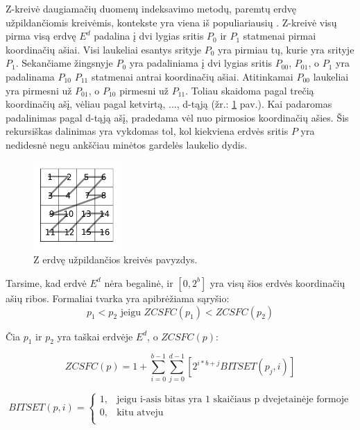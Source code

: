 Z-kreivė daugiamačių duomenų indeksavimo metodų, paremtų erdvę užpildančiomis kreivėmis, kontekste yra viena iš populiariausių \cite{ramsak2000integrating}.
Z-kreivė visų pirma visą erdvę $E^d$ padalina į dvi lygias sritis $P_0$ ir $P_1$ statmenai pirmai koordinačių ašiai.
Visi laukeliai esantys srityje $P_0$ yra pirmiau tų, kurie yra srityje $P_1$.
Sekančiame žingsnyje $P_0$ yra padaliniama į dvi lygias sritis $P_{00}$, $P_{01}$, o $P_1$ yra padalinama $P_{10}$ $P_{11}$ statmenai antrai koordinačių ašiai.
Atitinkamai $P_{00}$ laukeliai yra pirmesni už $P_{01}$, o $P_{10}$ pirmesni už $P_{11}$.
Toliau skaidoma pagal trečią koordinačių ašį, vėliau pagal ketvirtą, ..., d-tąją (žr.: \ref{img:ZCurveSpaceFillingCurve} pav.).
Kai padaromas padalinimas pagal d-tąją ašį, pradedama vėl nuo pirmosios koordinačių ašies.
Šis rekursiškas dalinimas yra vykdomas tol, kol kiekviena erdvės sritis $P$ yra nedidesnė negu ankščiau minėtos gardelės laukelio dydis.

\begin{figure}[H]
\begin{center}
\includegraphics[width=0.3\textwidth]{img/ZCurveSpaceFillingCurve.png}
\caption{Z erdvę užpildančios kreivės pavyzdys.}
\label{img:ZCurveSpaceFillingCurve}
\end{center}
\end{figure}

Tarsime, kad erdvė $E^d$ nėra begalinė, ir $[0, 2^b]$ yra visų šios erdvės koordinačių ašių ribos.
Formaliai tvarka yra apibrėžiama sąryšio:
\begin{equation}
	p_1 < p_2 \text{ jeigu } ZCSFC(p_1) < ZCSFC(p_2)
\label{eq:ZCurveSFCComparison}
\end{equation}

Čia $p_1$ ir $p_2$ yra taškai erdvėje $E^d$, o $ZCSFC(p)$:

\begin{equation}
	ZCSFC(p) = 1 + \sum_{i=0}^{b-1} \sum_{j=0}^{d-1} [2^{i*b+j} BITSET(p_j, i)]
\label{eq:ZCurveSFCValue}
\end{equation}


\begin{equation}
	BITSET(p, i)=
\begin{cases}
	1,& \text{jeigu } \text{i-asis bitas yra 1 skaičiaus p dvejetainėje formoje}\\
	0,& \text{kitu atveju}\\
\end{cases}
\label{eq:Bitset}
\end{equation}






